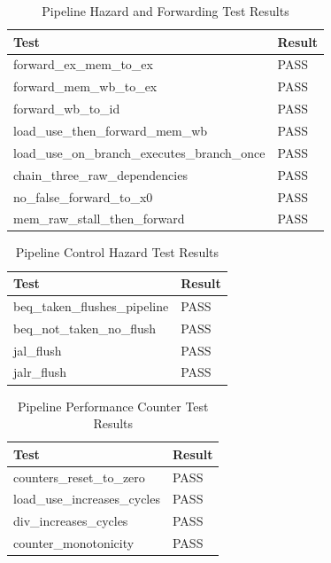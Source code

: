 \begin{table}[htbp]
\centering
\caption{Pipeline Hazard and Forwarding Test Results}
\label{tab:hazards}
\begin{tabular}{ll}
\toprule
Test & Result \\
\midrule
forward\_ex\_mem\_to\_ex & \textcolor{green!60!black}{PASS} \\
forward\_mem\_wb\_to\_ex & \textcolor{green!60!black}{PASS} \\
forward\_wb\_to\_id & \textcolor{green!60!black}{PASS} \\
load\_use\_then\_forward\_mem\_wb & \textcolor{green!60!black}{PASS} \\
load\_use\_on\_branch\_executes\_branch\_once & \textcolor{green!60!black}{PASS} \\
chain\_three\_raw\_dependencies & \textcolor{green!60!black}{PASS} \\
no\_false\_forward\_to\_x0 & \textcolor{green!60!black}{PASS} \\
mem\_raw\_stall\_then\_forward & \textcolor{green!60!black}{PASS} \\
\bottomrule
\end{tabular}
\end{table}
\begin{table}[htbp]
\centering
\caption{Pipeline Control Hazard Test Results}
\label{tab:control}
\begin{tabular}{ll}
\toprule
Test & Result \\
\midrule
beq\_taken\_flushes\_pipeline & \textcolor{green!60!black}{PASS} \\
beq\_not\_taken\_no\_flush & \textcolor{green!60!black}{PASS} \\
jal\_flush & \textcolor{green!60!black}{PASS} \\
jalr\_flush & \textcolor{green!60!black}{PASS} \\
\bottomrule
\end{tabular}
\end{table}
\begin{table}[htbp]
\centering
\caption{Pipeline Performance Counter Test Results}
\label{tab:cpi}
\begin{tabular}{ll}
\toprule
Test & Result \\
\midrule
counters\_reset\_to\_zero & \textcolor{green!60!black}{PASS} \\
load\_use\_increases\_cycles & \textcolor{green!60!black}{PASS} \\
div\_increases\_cycles & \textcolor{green!60!black}{PASS} \\
counter\_monotonicity & \textcolor{green!60!black}{PASS} \\
\bottomrule
\end{tabular}
\end{table}